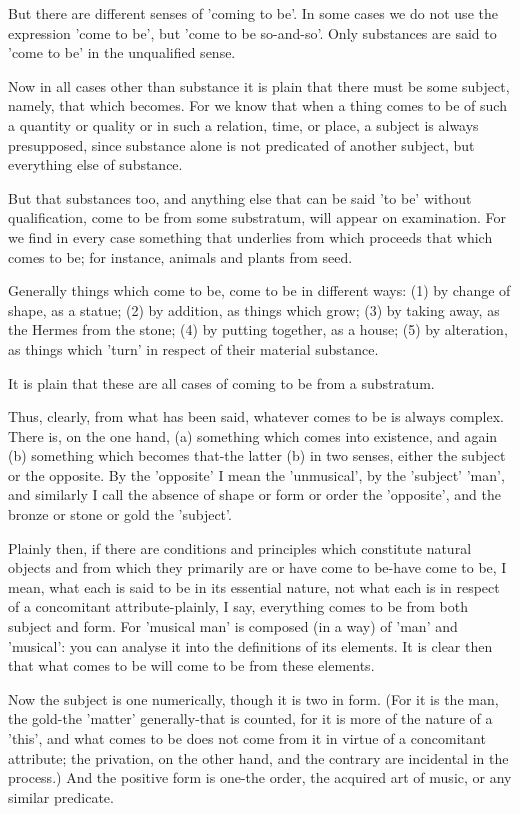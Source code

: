 But there are different senses of 'coming to be'. In some cases we
do not use the expression 'come to be', but 'come to be so-and-so'.
Only substances are said to 'come to be' in the unqualified sense.

Now in all cases other than substance it is plain that there must
be some subject, namely, that which becomes. For we know that when
a thing comes to be of such a quantity or quality or in such a relation,
time, or place, a subject is always presupposed, since substance alone
is not predicated of another subject, but everything else of substance.

But that substances too, and anything else that can be said 'to be'
without qualification, come to be from some substratum, will appear
on examination. For we find in every case something that underlies
from which proceeds that which comes to be; for instance, animals
and plants from seed. 

Generally things which come to be, come to be in different ways: (1)
by change of shape, as a statue; (2) by addition, as things which
grow; (3) by taking away, as the Hermes from the stone; (4) by putting
together, as a house; (5) by alteration, as things which 'turn' in
respect of their material substance. 

It is plain that these are all cases of coming to be from a substratum.

Thus, clearly, from what has been said, whatever comes to be is always
complex. There is, on the one hand, (a) something which comes into
existence, and again (b) something which becomes that-the latter (b)
in two senses, either the subject or the opposite. By the 'opposite'
I mean the 'unmusical', by the 'subject' 'man', and similarly I call
the absence of shape or form or order the 'opposite', and the bronze
or stone or gold the 'subject'. 

Plainly then, if there are conditions and principles which constitute
natural objects and from which they primarily are or have come to
be-have come to be, I mean, what each is said to be in its essential
nature, not what each is in respect of a concomitant attribute-plainly,
I say, everything comes to be from both subject and form. For 'musical
man' is composed (in a way) of 'man' and 'musical': you can analyse
it into the definitions of its elements. It is clear then that what
comes to be will come to be from these elements. 

Now the subject is one numerically, though it is two in form. (For
it is the man, the gold-the 'matter' generally-that is counted, for
it is more of the nature of a 'this', and what comes to be does not
come from it in virtue of a concomitant attribute; the privation,
on the other hand, and the contrary are incidental in the process.)
And the positive form is one-the order, the acquired art of music,
or any similar predicate. 

